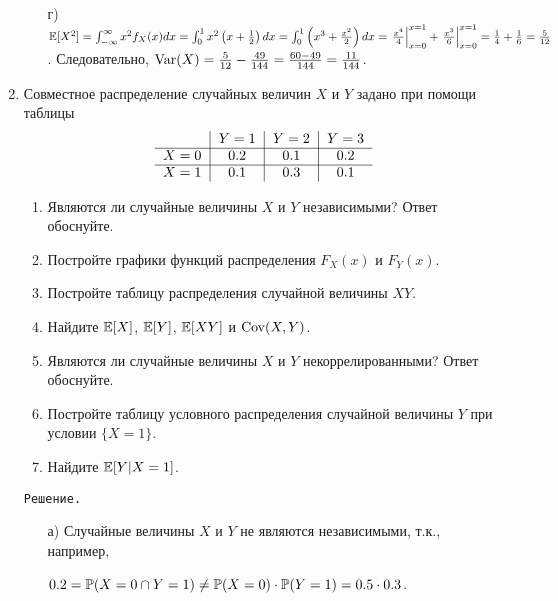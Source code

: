 \begin{enumerate}
\begin{enumerate}
\item[г)] $\E[X^2] = \int_{-\infty}^{\infty}x^2f_X(x)dx = \int_{0}^{1}x^2\left(x+\frac{1}{2}\right)dx = \int_{0}^{1}\left(x^3+\frac{x^2}{2}\right)dx = \left.\frac{x^4}{4}\right|_{x=0}^{x=1} + \left.\frac{x^3}{6}\right|_{x=0}^{x=1} = \frac{1}{4} + \frac{1}{6} = \frac{5}{12}$.
Следовательно, $\Var(X) = \frac{5}{12} - \frac{49}{144} = \frac{60-49}{144} = \frac{11}{144}$.
\end{enumerate}

\item Совместное распределение случайных величин $X$ и $Y$ задано при помощи таблицы
\[
\begin{tabular}{c|c|c|c}
  {}     & $Y=1$   & $Y=2$   & $Y=3$ \\ \cline{1-4}
  $X=0$  & $0.2$   & $0.1$   & $0.2$ \\ \cline{1-4}
  $X=1$  & $0.1$   & $0.3$   & $0.1$ \\
\end{tabular}
\]
\begin{enumerate}
  \item Являются ли случайные величины $X$ и $Y$ независимыми? Ответ обоснуйте.
  \item Постройте графики функций распределения $F_X(x)$ и $F_Y(x)$.
  \item Постройте таблицу распределения случайной величины $XY$.
  \item Найдите $\E[X]$, $\E[Y]$, $\E[XY]$ и $\Cov(X,Y)$.
  \item Являются ли случайные величины $X$ и $Y$ некоррелированными? Ответ обоснуйте.
  \item Постройте таблицу условного распределения случайной величины $Y$ при условии $\{X = 1\}$.
  \item Найдите $\E[Y|X = 1]$.
\end{enumerate}

\verb"Решение."
\begin{enumerate}
\item[а)] Случайные величины $X$ и $Y$ не являются независимыми, т.к., например,

$0.2 = \P(X=0 \cap Y=1) \not= \P(X=0) \cdot \P(Y=1) = 0.5 \cdot 0.3$.


\end{enumerate}
\end{enumerate}
